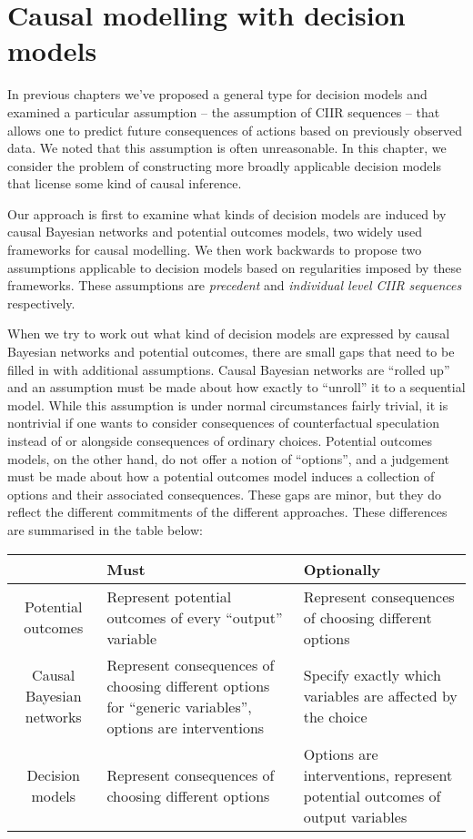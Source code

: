
\chapter{Causal modelling with decision models}\label{ch:other_causal_frameworks}

In previous chapters we've proposed a general type for decision models and examined a particular assumption -- the assumption of CIIR sequences -- that allows one to predict future consequences of actions based on previously observed data. We noted that this assumption is often unreasonable. In this chapter, we consider the problem of constructing more broadly applicable decision models that license some kind of causal inference. 

Our approach is first to examine what kinds of decision models are induced by causal Bayesian networks and potential outcomes models, two widely used frameworks for causal modelling. We then work backwards to propose two assumptions applicable to decision models based on regularities imposed by these frameworks. These assumptions are \emph{precedent} and \emph{individual level CIIR sequences} respectively.

When we try to work out what kind of decision models are expressed by causal Bayesian networks and potential outcomes, there are small gaps that need to be filled in with additional assumptions. Causal Bayesian networks are ``rolled up'' and an assumption must be made about how exactly to ``unroll'' it to a sequential model. While this assumption is under normal circumstances fairly trivial, it is nontrivial if one wants to consider consequences of counterfactual speculation instead of or alongside consequences of ordinary choices. Potential outcomes models, on the other hand, do not offer a notion of ``options'', and a judgement must be made about how a potential outcomes model induces a collection of options and their associated consequences. These gaps are minor, but they do reflect the different commitments of the different approaches. These differences are summarised in the table below:

\begin{center}
\begin{tabular}{ |c|p{4cm}|p{4cm}| } 
 \hline
  & Must & Optionally  \\
 \hline
 Potential outcomes & Represent potential outcomes of every ``output'' variable & Represent consequences of choosing different options \\ 
 Causal Bayesian networks & Represent consequences of choosing different options for ``generic variables'', options are interventions & Specify exactly which variables are affected by the choice \\
 Decision models & Represent consequences of choosing different options & Options are interventions, represent potential outcomes of output variables\\
 \hline
\end{tabular}
\end{center}

